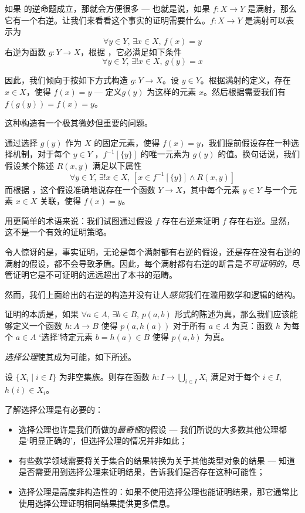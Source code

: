 如果  的逆命题成立，那就会方便很多 --- 也就是说，如果 $f : X \to Y$ 是满射，那么它有一个右逆。让我们来看看这个事实的证明需要什么。$f : X \to Y$ 是满射可以表示为
\[ \forall y \in Y,\, \exists x \in X,\, f(x) = y \]
右逆为函数 $g : Y \to X$，根据 ，它必满足如下条件
\[ \forall y \in Y,\, \exists ! x \in X,\, g(y) = x \]

因此，我们倾向于按如下方式构造 $g : Y \to X$。设 $y \in Y$。根据满射的定义，存在 $x \in X$，使得 $f(x) = y$ --- 定义$g(y)$ 为这样的元素 $x$。然后根据需要我们有 $f(g(y)) = f(x) = y$。

这种构造有一个极其微妙但重要的问题。

通过选择 $g(y)$ 作为 $X$ 的固定元素，使得 $f(x) = y$，我们提前假设存在一种选择机制，对于每个 $y \in Y$ ，$f^{-1}[\{y\}]$ 的唯一元素为 $g(y)$ 的值。换句话说，我们假设某个陈述 $R(x,y)$ 满足以下属性
\[ \forall y \in Y,\, \exists ! x \in X,\, [x \in f^{-1}[\{y\}] \wedge R(x,y)] \]
而根据 ，这个假设准确地说存在一个函数 $Y \to X$，其中每个元素 $y \in Y$ 与一个元素 $x \in X$ 关联，使得 $f(x) = y$。

用更简单的术语来说：我们试图通过假设 $f$ 存在右逆来证明 $f$ 存在右逆。显然，这不是一个有效的证明策略。

令人惊讶的是，事实证明，无论是每个满射都有右逆的假设，还是存在没有右逆的满射的假设，都不会导致矛盾。因此，每个满射都有右逆的断言是\textit{不可证明的}，尽管证明它是不可证明的远远超出了本书的范畴。

然而，我们上面给出的右逆的构造并没有让人\textit{感觉}我们在滥用数学和逻辑的结构。

证明的本质是，如果 $\forall a \in A,\, \exists b \in B,\, p(a,b)$ 形式的陈述为真，那么我们应该能够定义一个函数 $h : A \to B$ 使得 $p(a,h(a))$ 对于所有 $a \in A$ 为真：函数 $h$ 为每个 $a \in A$ `选择'特定元素 $b = h(a) \in B$ 使得 $p(a,b)$ 为真。

\textit{选择公理}使其成为可能，如下所述。

\begin{axiom}[选择公理]
\label{axChoice}
设 $\{ X_i \mid i \in I \}$ 为非空集族。则存在函数 $h : I \to \bigcup\limits_{i \in I} X_i$ 满足对于每个 $i \in I$, $h(i) \in X_i$。
\end{axiom}

了解选择公理是有必要的：
\begin{itemize}
\item 选择公理也许是我们所做的\textit{最奇怪}的假设 --- 我们所说的大多数其他公理都是`明显正确的'，但选择公理的情况并非如此；
\item 有些数学领域需要将关于集合的结果转换为关于其他类型对象的结果 --- 知道是否需要用到选择公理来证明结果，告诉我们是否存在这种可能性；
\item 选择公理是高度非构造性的：如果不使用选择公理也能证明结果，那它通常比使用选择公理证明相同结果提供更多信息。
\end{itemize}

